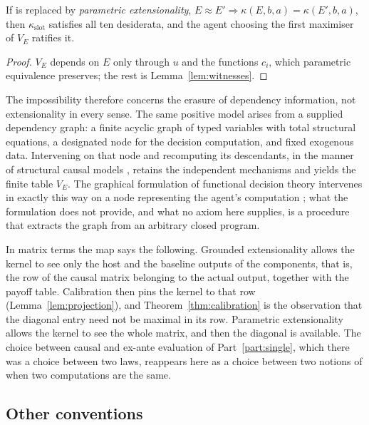 \begin{corollary}\label{cor:parametric}
If  is replaced by \emph{parametric extensionality}, $E\approx E'\Rightarrow\kappa(E,b,a)=\kappa(E',b,a)$,
then $\kappa_{\mathrm{slot}}$ satisfies all ten desiderata, and the agent choosing the first maximiser
of $V_E$ ratifies it.
\end{corollary}

\begin{proof}
$V_E$ depends on $E$ only through $u$ and the functions $c_i$, which parametric equivalence preserves;
the rest is Lemma~\ref{lem:witnesses}.
\end{proof}

The impossibility therefore concerns the erasure of dependency information, not extensionality in
every sense. The same positive model arises from a supplied dependency graph: a finite acyclic graph
of typed variables with total structural equations, a designated node for the decision computation,
and fixed exogenous data. Intervening on that node and recomputing its descendants, in the manner of
structural causal models \autocite{pearl2009}, retains the independent mechanisms and yields the
finite table $V_E$. The graphical formulation of functional decision theory intervenes in exactly
this way on a node representing the agent's computation \autocite[§§5--6]{yudkowskysoares2017}; what
the formulation does not provide, and what no axiom here supplies, is a procedure that extracts the
graph from an arbitrary closed program.

In matrix terms the map says the following. Grounded extensionality allows the kernel to see only
the host and the baseline outputs of the components, that is, the row of the causal matrix belonging
to the actual output, together with the payoff table. Calibration then pins the kernel to that row
(Lemma~\ref{lem:projection}), and Theorem~\ref{thm:calibration} is the observation that the diagonal
entry need not be maximal in its row. Parametric extensionality allows the kernel to see the whole
matrix, and then the diagonal is available. The choice between causal and ex-ante evaluation of
Part~\ref{part:single}, which there was a choice between two laws, reappears here as a choice between
two notions of when two computations are the same.

\subsection{Other conventions}\label{sec:otherconventions}

